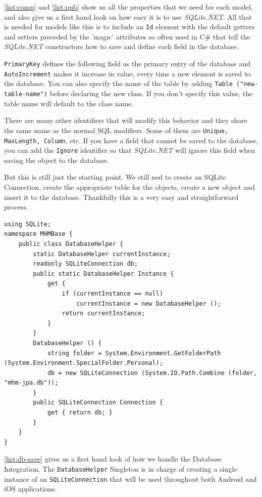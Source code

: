 \autoref{list:comp} and \autoref{list:pub} show us all the properties that we need for each model, and also give us a first hand look on how easy it is to use \textit{SQLite.NET}. All that is needed for models like this is to include an \texttt{Id} element with the default getters and setters preceded by the 'magic' attributes so often used in C\# that tell the \textit{SQLite.NET} constructors how to save and define each field in the database. 

\texttt{PrimaryKey} defines the following field as the primary entry of the database and \texttt{AutoIncrement} makes it increase in value, every time a new element is saved to the database. You can also specify the name of the table by adding \texttt{Table ("new-table-name")} before declaring the new class. If you don't specify this value, the table name will default to the class name.

There are many other identifiers that will modify this behavior and they share the same name as the normal SQL modifiers. Some of them are \texttt{Unique, MaxLength, Column}, etc. If you have a field that cannot be saved to the database, you can add the \texttt{Ignore} identifier so that \textit{SQLite.NET} will ignore this field when saving the object to the database.

But this is still just the starting point. We still ned to create an SQLite Connection, create the appropriate table for the objects, create a new object and insert it to the database. Thankfully this is a very easy and straightforward process.

\begin{lstlisting}[frame=lt,caption=DatabaseHelper.cs, label={list:db-save}]
using SQLite;
namespace MHMBase {
	public class DatabaseHelper {
		static DatabaseHelper currentInstance;
		readonly SQLiteConnection db;
		public static DatabaseHelper Instance {
			get {
				if (currentInstance == null)
					currentInstance = new DatabaseHelper ();
				return currentInstance;			
			}
		}
		DatabaseHelper () {
			string folder = System.Environment.GetFolderPath (System.Environment.SpecialFolder.Personal);
			db = new SQLiteConnection (System.IO.Path.Combine (folder, "mhm-jpa.db"));		
		}
		public SQLiteConnection Connection {
			get { return db; }		
		}
	}
}
\end{lstlisting}
\newpage

\autoref{list:db-save} gives us a first hand look of how we handle the Database Integration. The \texttt{DatabaseHelper} Singleton  is in charge of creating a single instance of an \texttt{SQLiteConnection} that will be used throughout both Android and iOS applications.

